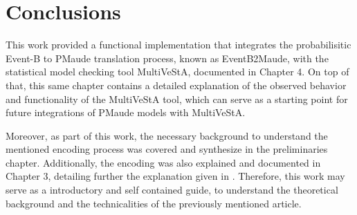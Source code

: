 \chapter{Conclusions}
\begin{comment}
Real world systems increase every day in complexity. This tendency demands more modeling and verification features from formal methods in order to mathematically proof properties over them. Hence, extending formal languages like Event-B with probabilistic capabilities allow to model and verify new complex systems.   

In order to contribute to probabilistic Event-B, it is necessary to think of new approaches that can contribute to the overall ability of probabilistic Event-B to verify probabilistic systems. Thus, the rewriting logic approach to probabilistic Event-B expands on probabilistic Event-B in the following way: it allows to translate any non-probabilistic and probabilistic Event-B model to a PMaude specification. Furthermore, the translated probabilistic Event-B models can access all the available tools for probabilistic model checking in Maude like MultiVeStA.

\end{comment}

This work provided a functional implementation that integrates the probabilisitic Event-B to PMaude translation process, known as EventB2Maude, with the statistical model checking tool MultiVeStA, documented in Chapter 4. On top of that, this same chapter contains a detailed explanation of the observed behavior and functionality of the MultiVeStA tool, which can serve as a starting point for future integrations of PMaude models with MultiVeStA.    

Moreover, as part of this work, the necessary background to understand the mentioned encoding process was covered and synthesize in the preliminaries chapter. Additionally, the encoding was also explained and documented in Chapter 3, detailing further the explanation given in \cite{Olarte}. Therefore, this work may serve as a introductory and self contained guide, to understand the theoretical background and the technicalities of the previously mentioned article.

